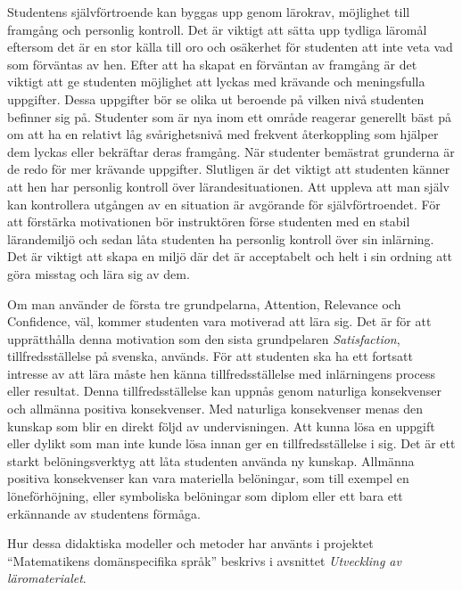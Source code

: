 \documentclass[]{article}
\begin{document}
Studentens självförtroende kan byggas upp genom lärokrav, möjlighet
till fram\-gång och personlig kontroll. Det är viktigt att sätta upp
tydliga läromål eftersom det är en stor källa till oro och osäkerhet
för studenten att inte veta vad som förväntas av hen. Efter att ha
skapat en förväntan av framgång är det viktigt att ge studenten
möjlighet att lyckas med krävande och meningsfulla uppgifter. Dessa
uppgifter bör se olika ut beroende på vilken nivå studenten befinner
sig på. Studenter som är nya inom ett område reagerar generellt bäst
på om att ha en relativt låg svårighetsnivå med frekvent återkoppling
som hjälper dem lyckas eller bekräftar deras framgång. När studenter
bemästrat grunderna är de redo för mer krävande uppgifter.
Slutligen är det viktigt att studenten känner att hen har personlig
kontroll över lärandesituationen. Att uppleva att man själv kan
kontrollera utgången av en situation är avgörande för självförtroendet.
För att förstärka motivationen bör instruktören förse studenten med en
stabil lärandemiljö och sedan låta studenten ha personlig kontroll över sin
inlärning. Det är viktigt att skapa en miljö där det är acceptabelt och helt
i sin ordning att göra misstag och lära sig av dem.

Om man använder de första tre grundpelarna, Attention, Relevance och
Confidence, väl, kommer studenten vara motiverad att lära sig. Det är
för att upprätthålla denna motivation som den sista grundpelaren
\textit{Satisfaction}, tillfredsställelse på svenska, används. För
att studenten ska ha ett fortsatt intresse av att lära måste hen känna
tillfredsställelse med inlärningens process eller resultat. Denna
tillfredsställelse kan uppnås genom naturliga konsekvenser och
allmänna positiva konsekvenser. Med naturliga konsekvenser menas den
kunskap som blir en direkt följd av undervisningen. Att kunna lösa en
uppgift eller dylikt som man inte kunde lösa innan ger en
tillfredsställelse i sig. Det är ett starkt belöningsverktyg att låta
studenten använda ny kunskap. Allmänna positiva konsekvenser kan vara
materiella belöningar, som till exempel en löneförhöjning, eller
symboliska belöningar som diplom eller ett bara ett erkännande av
studentens förmåga.

Hur dessa didaktiska modeller och metoder har använts i projektet
``Matematikens domänspecifika språk'' beskrivs i avsnittet
\textit{Utveckling av läromaterialet}.
\end{document}
